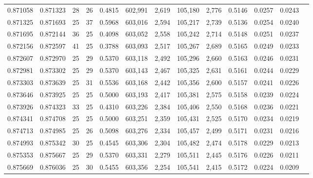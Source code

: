 \begin{tabular}{rrrrrrrrrrrrr}
0.871058 & 0.871323 &    28 &  26 &                                     0.4815 & 602,991 &   2,619 & 105,180 &   2,776 & 0.5146 & 0.0257 & 0.0243 \\
0.871325 & 0.871693 &    25 &  37 &                                     0.5968 & 603,016 &   2,594 & 105,217 &   2,739 & 0.5136 & 0.0254 & 0.0240 \\
0.871695 & 0.872144 &    36 &  25 &                                     0.4098 & 603,052 &   2,558 & 105,242 &   2,714 & 0.5148 & 0.0251 & 0.0237 \\
0.872156 & 0.872597 &    41 &  25 &                                     0.3788 & 603,093 &   2,517 & 105,267 &   2,689 & 0.5165 & 0.0249 & 0.0233 \\
0.872607 & 0.872970 &    25 &  29 &                                     0.5370 & 603,118 &   2,492 & 105,296 &   2,660 & 0.5163 & 0.0246 & 0.0231 \\
0.872981 & 0.873302 &    25 &  29 &                                     0.5370 & 603,143 &   2,467 & 105,325 &   2,631 & 0.5161 & 0.0244 & 0.0229 \\
0.873303 & 0.873639 &    25 &  31 &                                     0.5536 & 603,168 &   2,442 & 105,356 &   2,600 & 0.5157 & 0.0241 & 0.0226 \\
0.873646 & 0.873925 &    25 &  25 &                                     0.5000 & 603,193 &   2,417 & 105,381 &   2,575 & 0.5158 & 0.0239 & 0.0224 \\
0.873926 & 0.874323 &    33 &  25 &                                     0.4310 & 603,226 &   2,384 & 105,406 &   2,550 & 0.5168 & 0.0236 & 0.0221 \\
0.874341 & 0.874708 &    25 &  25 &                                     0.5000 & 603,251 &   2,359 & 105,431 &   2,525 & 0.5170 & 0.0234 & 0.0219 \\
0.874713 & 0.874985 &    25 &  26 &                                     0.5098 & 603,276 &   2,334 & 105,457 &   2,499 & 0.5171 & 0.0231 & 0.0216 \\
0.874993 & 0.875342 &    30 &  25 &                                     0.4545 & 603,306 &   2,304 & 105,482 &   2,474 & 0.5178 & 0.0229 & 0.0213 \\
0.875353 & 0.875667 &    25 &  29 &                                     0.5370 & 603,331 &   2,279 & 105,511 &   2,445 & 0.5176 & 0.0226 & 0.0211 \\
0.875669 & 0.876036 &    25 &  30 &                                     0.5455 & 603,356 &   2,254 & 105,541 &   2,415 & 0.5172 & 0.0224 & 0.0209 \\

\end{tabular}
